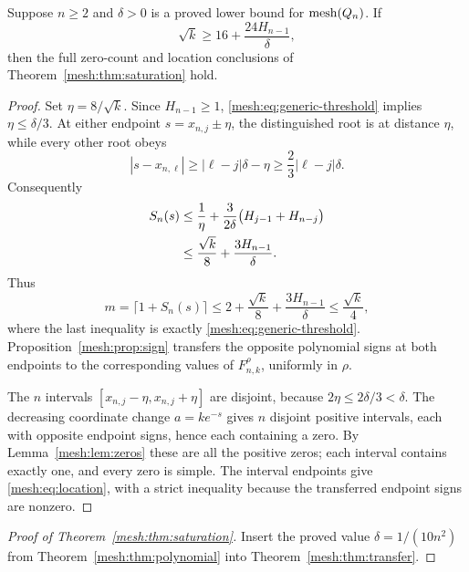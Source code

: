 \begin{theorem}
\label{mesh:thm:transfer}
Suppose $n\geq2$ and $\delta>0$ is a proved lower bound for
$\operatorname{mesh}(Q_n)$. If
\begin{equation}\label{mesh:eq:generic-threshold}
 \sqrt{k}\geq16+\frac{24H_{n-1}}\delta,
\end{equation}
then the full zero-count and location conclusions of
Theorem~\ref{mesh:thm:saturation} hold.
\end{theorem}
\begin{proof}
Set $\eta=8/\sqrt{k}$. Since $H_{n-1}\geq1$,
\eqref{mesh:eq:generic-threshold} implies $\eta\leq\delta/3$.
At either endpoint $s=x_{n,j}\pm\eta$, the distinguished root is
at distance $\eta$, while every other root obeys
\[
 |s-x_{n,\ell}|\geq|\ell-j|\delta-\eta
      \geq\frac23|\ell-j|\delta.
\]
Consequently
\begin{align}
 S_n(s)&\leq\frac1\eta+
       \frac3{2\delta}\bigl(H_{j-1}+H_{n-j}\bigr)\notag\\
 &\leq\frac{\sqrt{k}}8+\frac{3H_{n-1}}\delta.
 \label{mesh:eq:harmonic-distance}
\end{align}
Thus
\[
 m=\lceil1+S_n(s)\rceil
 \leq2+\frac{\sqrt{k}}8+\frac{3H_{n-1}}\delta
 \leq\frac{\sqrt{k}}4,
\]
where the last inequality is exactly
\eqref{mesh:eq:generic-threshold}. Proposition~\ref{mesh:prop:sign}
transfers the opposite polynomial signs at both endpoints to the
corresponding values of $F_{n,k}^\rho$, uniformly in $\rho$.

The $n$ intervals $[x_{n,j}-\eta,x_{n,j}+\eta]$ are disjoint,
because $2\eta\leq2\delta/3<\delta$. The decreasing coordinate
change $a=ke^{-s}$ gives $n$ disjoint positive intervals, each with
opposite endpoint signs, hence each containing a zero. By
Lemma~\ref{mesh:lem:zeros} these are all the positive zeros;
each interval contains exactly one, and every zero is simple.
The interval endpoints give \eqref{mesh:eq:location}, with a strict
inequality because the transferred endpoint signs are nonzero.
\end{proof}

\begin{proof}[Proof of Theorem~\ref{mesh:thm:saturation}]
Insert the proved value $\delta=1/(10n^2)$ from
Theorem~\ref{mesh:thm:polynomial} into
Theorem~\ref{mesh:thm:transfer}.
\end{proof}

